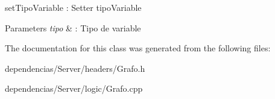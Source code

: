 set\+Tipo\+Variable \+: Setter tipo\+Variable 


\begin{DoxyParams}{Parameters}
{\em tipo} & \+: Tipo de variable \\
\hline
\end{DoxyParams}


The documentation for this class was generated from the following files\+:\begin{DoxyCompactItemize}
\item 
dependencias/\+Server/headers/Grafo.\+h\item 
dependencias/\+Server/logic/Grafo.\+cpp\end{DoxyCompactItemize}

